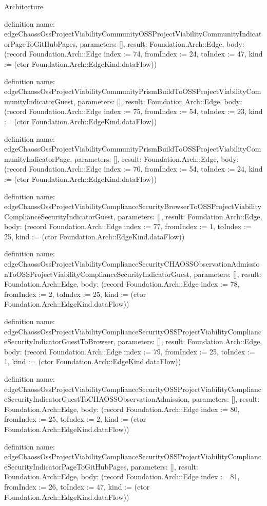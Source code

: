 \begin{lexlean}{Architecture}
\begin{semanticmodule}
definition{
  name: edgeChaossOssProjectViabilityCommunityOSSProjectViabilityCommunityIndicatorPageToGitHubPages,
  parameters: [],
  result: Foundation.Arch::Edge,
  body: (record Foundation.Arch::Edge {index := 74, fromIndex := 24, toIndex := 47, kind := (ctor Foundation.Arch::EdgeKind.dataFlow)})
}

definition{
  name: edgeChaossOssProjectViabilityCommunityPrismBuildToOSSProjectViabilityCommunityIndicatorGuest,
  parameters: [],
  result: Foundation.Arch::Edge,
  body: (record Foundation.Arch::Edge {index := 75, fromIndex := 54, toIndex := 23, kind := (ctor Foundation.Arch::EdgeKind.dataFlow)})
}

definition{
  name: edgeChaossOssProjectViabilityCommunityPrismBuildToOSSProjectViabilityCommunityIndicatorPage,
  parameters: [],
  result: Foundation.Arch::Edge,
  body: (record Foundation.Arch::Edge {index := 76, fromIndex := 54, toIndex := 24, kind := (ctor Foundation.Arch::EdgeKind.dataFlow)})
}

definition{
  name: edgeChaossOssProjectViabilityComplianceSecurityBrowserToOSSProjectViabilityComplianceSecurityIndicatorGuest,
  parameters: [],
  result: Foundation.Arch::Edge,
  body: (record Foundation.Arch::Edge {index := 77, fromIndex := 1, toIndex := 25, kind := (ctor Foundation.Arch::EdgeKind.dataFlow)})
}

definition{
  name: edgeChaossOssProjectViabilityComplianceSecurityCHAOSSObservationAdmissionToOSSProjectViabilityComplianceSecurityIndicatorGuest,
  parameters: [],
  result: Foundation.Arch::Edge,
  body: (record Foundation.Arch::Edge {index := 78, fromIndex := 2, toIndex := 25, kind := (ctor Foundation.Arch::EdgeKind.dataFlow)})
}

definition{
  name: edgeChaossOssProjectViabilityComplianceSecurityOSSProjectViabilityComplianceSecurityIndicatorGuestToBrowser,
  parameters: [],
  result: Foundation.Arch::Edge,
  body: (record Foundation.Arch::Edge {index := 79, fromIndex := 25, toIndex := 1, kind := (ctor Foundation.Arch::EdgeKind.dataFlow)})
}

definition{
  name: edgeChaossOssProjectViabilityComplianceSecurityOSSProjectViabilityComplianceSecurityIndicatorGuestToCHAOSSObservationAdmission,
  parameters: [],
  result: Foundation.Arch::Edge,
  body: (record Foundation.Arch::Edge {index := 80, fromIndex := 25, toIndex := 2, kind := (ctor Foundation.Arch::EdgeKind.dataFlow)})
}

definition{
  name: edgeChaossOssProjectViabilityComplianceSecurityOSSProjectViabilityComplianceSecurityIndicatorPageToGitHubPages,
  parameters: [],
  result: Foundation.Arch::Edge,
  body: (record Foundation.Arch::Edge {index := 81, fromIndex := 26, toIndex := 47, kind := (ctor Foundation.Arch::EdgeKind.dataFlow)})
}


\end{semanticmodule}
\end{lexlean}
